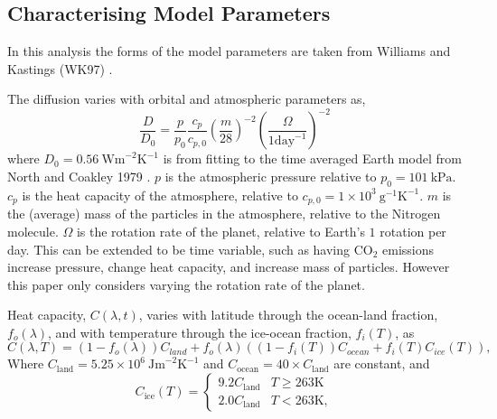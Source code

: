 \documentclass[12pt, onecolumn]{revtex4-2}    %
\newcommand{\heatcap}{\ensuremath{\ \text{Jm}^{-2} \text{K}^{-1}}}
\newcommand{\diffusion}{\ensuremath{\ \text{Wm}^{-2} \text{K}^{-1}}}
\begin{document}
\subsection{Characterising Model Parameters} \label{ssec:CharacterisingModelParameters} %
In this analysis the forms of the model parameters are taken from Williams and Kastings (WK97) \cite{WK97}.

The diffusion varies with orbital and atmospheric parameters as,
\begin{equation}
  \frac{D}{D_0} = \frac{p}{p_0} \frac{c_p}{c_{p,0}} \left(\frac{m}{28}\right)^{-2} \left(\frac{\Omega}{1 \text{day}^{-1}}\right)^{-2}
\end{equation}
where $D_0 = 0.56 \diffusion$ is from fitting to the time averaged Earth model from North and Coakley 1979 \cite{NC79}.
$p$ is the atmospheric pressure relative to $p_0 = 101 \ \text{kPa}$.
$c_p$ is the heat capacity of the atmosphere, relative to $c_{p,0} = 1\times10^3 \ \text{g}^{-1} \text{K}^{-1}$.
$m$ is the (average) mass of the particles in the atmosphere, relative to the Nitrogen molecule.
$\Omega$ is the rotation rate of the planet, relative to Earth's $1$ rotation per day.
This can be extended to be time variable, such as having CO$_2$ emissions increase pressure, change heat capacity, and increase mass of particles.
However this paper only considers varying the rotation rate of the planet.

Heat capacity, $C(\lambda, t)$, varies with latitude through the ocean-land fraction, $f_o(\lambda)$, and with temperature through the ice-ocean fraction, $f_i(T)$, as
\begin{equation}
  C(\lambda, T) = (1 - f_o(\lambda)) C_{land} + f_o(\lambda) ((1-f_i(T)) C_{ocean} + f_i(T) C_{ice}(T)),
\end{equation}
Where $C_{\text{land}} = 5.25\times10^6 \heatcap$ and $C_{\text{ocean}} = 40 \times C_{\text{land}}$ are constant, and
\begin{equation}
  C_{\text{ice}}(T) =
  \begin{cases}
    9.2 C_\text{land} & T \ge 263\text{K} \\
    2.0 C_\text{land} & T < 263\text{K},
  \end{cases}
\end{equation}
\end{document}
